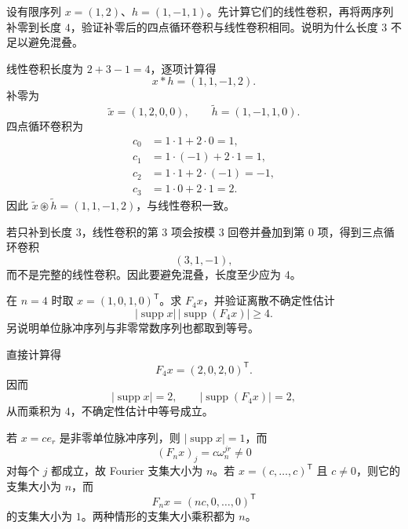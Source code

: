 \begin{exercise}[level=advanced]
设有限序列 $x=(1,2)$、$h=(1,-1,1)$。先计算它们的线性卷积，再将两序列补零到长度 $4$，验证补零后的四点循环卷积与线性卷积相同。说明为什么长度 $3$ 不足以避免混叠。
\begin{solution}
线性卷积长度为 $2+3-1=4$，逐项计算得
\[
x*h=(1,1,-1,2).
\]
补零为
\[
\widetilde x=(1,2,0,0),
\qquad
\widetilde h=(1,-1,1,0).
\]
四点循环卷积为
\begin{align*}
c_0&=1\cdot1+2\cdot0=1,\\
c_1&=1\cdot(-1)+2\cdot1=1,\\
c_2&=1\cdot1+2\cdot(-1)=-1,\\
c_3&=1\cdot0+2\cdot1=2.
\end{align*}
因此 $\widetilde x\mathbin{\circledast}\widetilde h=(1,1,-1,2)$，与线性卷积一致。

若只补到长度 $3$，线性卷积的第 $3$ 项会按模 $3$ 回卷并叠加到第 $0$ 项，得到三点循环卷积
\[
(3,1,-1),
\]
而不是完整的线性卷积。因此要避免混叠，长度至少应为 $4$。
\end{solution}
\end{exercise}

\begin{exercise}[level=advanced]
在 $n=4$ 时取 $x=(1,0,1,0)^{\mathsf T}$。求 $F_4x$，并验证离散不确定性估计
\[
|\operatorname{supp}x|\,|\operatorname{supp}(F_4x)|\ge4.
\]
另说明单位脉冲序列与非零常数序列也都取到等号。
\begin{solution}
直接计算得
\[
F_4x=(2,0,2,0)^{\mathsf T}.
\]
因而
\[
|\operatorname{supp}x|=2,
\qquad
|\operatorname{supp}(F_4x)|=2,
\]
从而乘积为 $4$，不确定性估计中等号成立。

若 $x=ce_r$ 是非零单位脉冲序列，则 $|\operatorname{supp}x|=1$，而
\[
(F_nx)_j=c\omega_n^{jr}\ne0
\]
对每个 $j$ 都成立，故 Fourier 支集大小为 $n$。若 $x=(c,\ldots,c)^{\mathsf T}$ 且 $c\ne0$，则它的支集大小为 $n$，而
\[
F_nx=(nc,0,\ldots,0)^{\mathsf T}
\]
的支集大小为 $1$。两种情形的支集大小乘积都为 $n$。
\end{solution}
\end{exercise}

